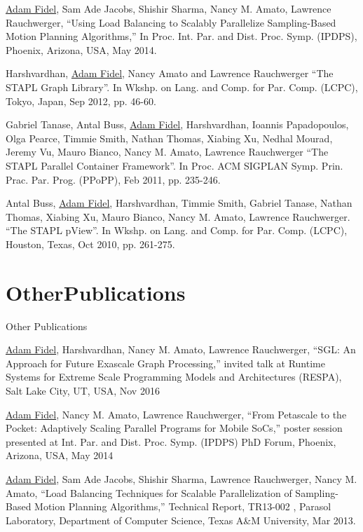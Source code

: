 \documentclass[a4paper,10pt,oneside]{article}
\begin{document}
\begin{body}
\EntryGap

{\underline{Adam Fidel}, Sam Ade Jacobs, Shishir Sharma, Nancy M. Amato, Lawrence Rauchwerger, ``Using Load Balancing to Scalably Parallelize Sampling-Based Motion Planning Algorithms,'' In Proc. Int. Par. and Dist. Proc. Symp. (IPDPS), Phoenix, Arizona, USA, May 2014.}

\EntryGap

{Harshvardhan, \underline{Adam Fidel}, Nancy Amato and Lawrence Rauchwerger ``The STAPL Graph Library''. In Wkshp. on Lang. and Comp. for Par. Comp. (LCPC), Tokyo, Japan, Sep 2012, pp. 46-60.}

\EntryGap

{Gabriel Tanase, Antal Buss, \underline{Adam Fidel}, Harshvardhan, Ioannis Papadopoulos, Olga Pearce, Timmie Smith, Nathan Thomas, Xiabing Xu, Nedhal Mourad, Jeremy Vu, Mauro Bianco, Nancy M. Amato, Lawrence Rauchwerger ``The STAPL Parallel Container Framework''. In Proc. ACM SIGPLAN Symp. Prin. Prac. Par. Prog. (PPoPP), Feb 2011, pp. 235-246.}

\EntryGap

{Antal Buss, \underline{Adam Fidel}, Harshvardhan, Timmie Smith, Gabriel Tanase, Nathan Thomas, Xiabing Xu, Mauro Bianco, Nancy M. Amato, Lawrence Rauchwerger. ``The STAPL pView''. In Wkshp. on Lang. and Comp. for Par. Comp. (LCPC), Houston, Texas, Oct 2010, pp. 261-275.}

\EntryGap

\section{OtherPublications}
{Other Publications}

{\underline{Adam Fidel}, Harshvardhan, Nancy M. Amato, Lawrence Rauchwerger, ``SGL: An Approach for Future Exascale Graph Processing,''
invited talk at Runtime Systems for Extreme Scale Programming Models and Architectures (RESPA), Salt Lake City, UT, USA, Nov 2016}

\EntryGap

{\underline{Adam Fidel}, Nancy M. Amato, Lawrence Rauchwerger, ``From Petascale to the Pocket: Adaptively Scaling Parallel Programs for Mobile SoCs,'' poster
session presented at Int. Par. and Dist. Proc. Symp. (IPDPS) PhD Forum, Phoenix, Arizona, USA, May 2014}

\EntryGap


{\underline{Adam Fidel}, Sam Ade Jacobs, Shishir Sharma, Lawrence Rauchwerger, Nancy M. Amato, ``Load Balancing Techniques for Scalable Parallelization of Sampling-Based Motion Planning Algorithms,'' Technical Report, TR13-002 , Parasol Laboratory, Department of Computer Science, Texas A\&M University, Mar 2013.}


\end{body}
\end{document}
